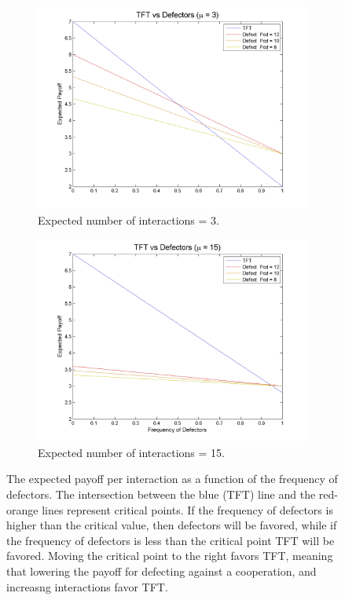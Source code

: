 \documentclass[11pt]{article} %
\begin{document}
\begin{figure}
	\begin{subfigure}[b]{0.55\textwidth}
		\centering
		\includegraphics[width=\textwidth]{files/figures/DvsTFT_mu3}
		\caption{Expected number of interactions = 3.}
	\end{subfigure}
	\begin{subfigure}[b]{0.55\textwidth}
		\centering
		\includegraphics[width=\textwidth]{files/figures/DvsTFT_mu15}
		\caption{Expected number of interactions = 15.}
	\end{subfigure}
	\caption{The expected payoff per interaction as a function of the frequency of defectors. The intersection
		    between the blue (TFT) line and the red-orange lines represent critical points. If the frequency
		    of defectors is higher than the critical value, then defectors will be favored, while if the
		   frequency of defectors is less than the critical point TFT will be favored. Moving the critical point
		  to the right favors TFT, meaning that lowering the payoff for defecting against a cooperation, and
	            increasng interactions favor TFT.}
	\label{tftvsd}
\end{figure}
\end{document}
